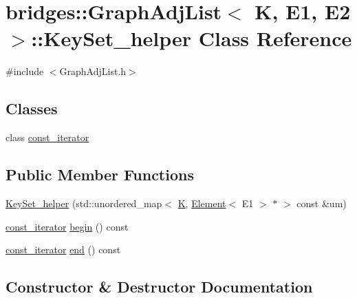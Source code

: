 \hypertarget{classbridges_1_1_graph_adj_list_1_1_key_set__helper}{}\section{bridges\+::Graph\+Adj\+List$<$ K, E1, E2 $>$\+::Key\+Set\+\_\+helper Class Reference}
\label{classbridges_1_1_graph_adj_list_1_1_key_set__helper}


{\ttfamily \#include $<$Graph\+Adj\+List.\+h$>$}

\subsection*{Classes}
\begin{DoxyCompactItemize}
\item 
class \mbox{\hyperlink{classbridges_1_1_graph_adj_list_1_1_key_set__helper_1_1const__iterator}{const\+\_\+iterator}}
\end{DoxyCompactItemize}
\subsection*{Public Member Functions}
\begin{DoxyCompactItemize}
\item 
\mbox{\hyperlink{classbridges_1_1_graph_adj_list_1_1_key_set__helper_a60ca294eeeae0ebf9d357ff4f197214e}{Key\+Set\+\_\+helper}} (std\+::unordered\+\_\+map$<$ \mbox{\hyperlink{namespacebridges_acfb0a4f7877d8f63de3e6862004c50edaa5f3c6a11b03839d46af9fb43c97c188}{K}}, \mbox{\hyperlink{classbridges_1_1_element}{Element}}$<$ E1 $>$ $\ast$ $>$ const \&um)
\item 
\mbox{\hyperlink{classbridges_1_1_graph_adj_list_1_1_key_set__helper_1_1const__iterator}{const\+\_\+iterator}} \mbox{\hyperlink{classbridges_1_1_graph_adj_list_1_1_key_set__helper_a13d241840008e50b94b3d12fbd897ebd}{begin}} () const
\item 
\mbox{\hyperlink{classbridges_1_1_graph_adj_list_1_1_key_set__helper_1_1const__iterator}{const\+\_\+iterator}} \mbox{\hyperlink{classbridges_1_1_graph_adj_list_1_1_key_set__helper_a581dd1d192896998e9d24bfa694c9036}{end}} () const
\end{DoxyCompactItemize}


\subsection{Constructor \& Destructor Documentation}
\mbox{\label{classbridges_1_1_graph_adj_list_1_1_key_set__helper_a60ca294eeeae0ebf9d357ff4f197214e}} 
